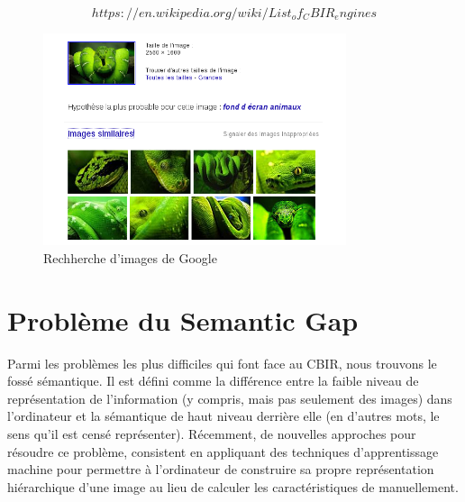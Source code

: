 $$https://en.wikipedia.org/wiki/List_of_CBIR_engines$$

\begin{figure}[H]
	\centering
		\includegraphics[width=3.5in]{Figures/googleImage2.png}
	\caption[An Electron]{Rechherche d'images de Google}
	\label{fig:Electron}
\end{figure}

\section{Problème du Semantic Gap}

	Parmi les problèmes  les plus difficiles qui font face au CBIR, nous trouvons le fossé sémantique. Il est défini comme la différence entre la faible niveau de représentation de l'information (y compris, mais pas seulement des images) dans l'ordinateur et la sémantique de haut niveau derrière elle (en d'autres mots, le sens qu'il est censé représenter).
Récemment, de nouvelles approches pour résoudre ce problème, consistent en appliquant des techniques d'apprentissage machine pour permettre à l'ordinateur de construire sa propre représentation hiérarchique d'une image au lieu de calculer les caractéristiques de manuellement.
